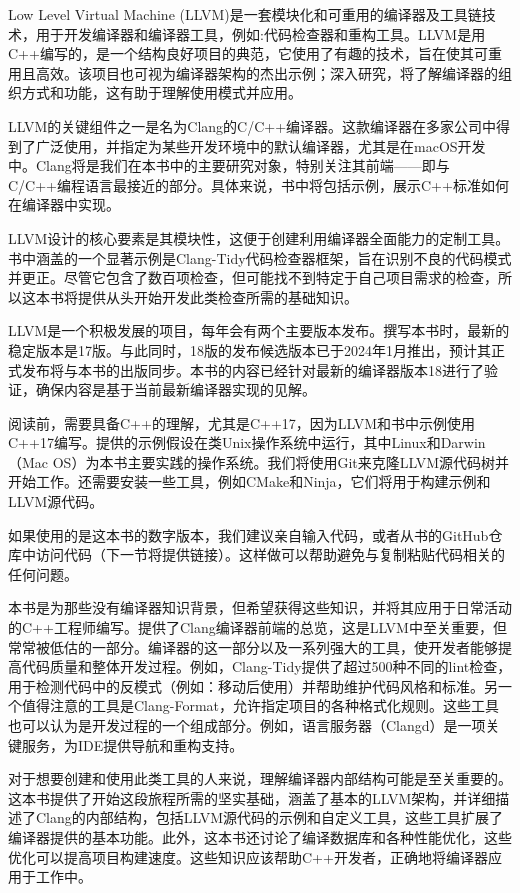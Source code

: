 Low Level Virtual Machine (LLVM)是一套模块化和可重用的编译器及工具链技术，用于开发编译器和编译器工具，例如:代码检查器和重构工具。LLVM是用C++编写的，是一个结构良好项目的典范，它使用了有趣的技术，旨在使其可重用且高效。该项目也可视为编译器架构的杰出示例；深入研究，将了解编译器的组织方式和功能，这有助于理解使用模式并应用。

LLVM的关键组件之一是名为Clang的C/C++编译器。这款编译器在多家公司中得到了广泛使用，并指定为某些开发环境中的默认编译器，尤其是在macOS开发中。Clang将是我们在本书中的主要研究对象，特别关注其前端——即与C/C++编程语言最接近的部分。具体来说，书中将包括示例，展示C++标准如何在编译器中实现。

LLVM设计的核心要素是其模块性，这便于创建利用编译器全面能力的定制工具。书中涵盖的一个显著示例是Clang-Tidy代码检查器框架，旨在识别不良的代码模式并更正。尽管它包含了数百项检查，但可能找不到特定于自己项目需求的检查，所以这本书将提供从头开始开发此类检查所需的基础知识。

LLVM是一个积极发展的项目，每年会有两个主要版本发布。撰写本书时，最新的稳定版本是17版。与此同时，18版的发布候选版本已于2024年1月推出，预计其正式发布将与本书的出版同步。本书的内容已经针对最新的编译器版本18进行了验证，确保内容是基于当前最新编译器实现的见解。


阅读前，需要具备C++的理解，尤其是C++17，因为LLVM和书中示例使用C++17编写。提供的示例假设在类Unix操作系统中运行，其中Linux和Darwin（Mac OS）为本书主要实践的操作系统。我们将使用Git来克隆LLVM源代码树并开始工作。还需要安装一些工具，例如CMake和Ninja，它们将用于构建示例和LLVM源代码。

如果使用的是这本书的数字版本，我们建议亲自输入代码，或者从书的GitHub仓库中访问代码（下一节将提供链接）。这样做可以帮助避免与复制粘贴代码相关的任何问题。


本书是为那些没有编译器知识背景，但希望获得这些知识，并将其应用于日常活动的C++工程师编写。提供了Clang编译器前端的总览，这是LLVM中至关重要，但常常被低估的一部分。编译器的这一部分以及一系列强大的工具，使开发者能够提高代码质量和整体开发过程。例如，Clang-Tidy提供了超过500种不同的lint检查，用于检测代码中的反模式（例如：移动后使用）并帮助维护代码风格和标准。另一个值得注意的工具是Clang-Format，允许指定项目的各种格式化规则。这些工具也可以认为是开发过程的一个组成部分。例如，语言服务器（Clangd）是一项关键服务，为IDE提供导航和重构支持。

对于想要创建和使用此类工具的人来说，理解编译器内部结构可能是至关重要的。这本书提供了开始这段旅程所需的坚实基础，涵盖了基本的LLVM架构，并详细描述了Clang的内部结构，包括LLVM源代码的示例和自定义工具，这些工具扩展了编译器提供的基本功能。此外，这本书还讨论了编译数据库和各种性能优化，这些优化可以提高项目构建速度。这些知识应该帮助C++开发者，正确地将编译器应用于工作中。

